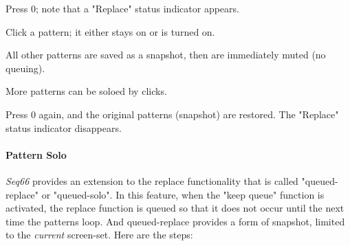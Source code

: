    \begin{enumber}
      \item Press 0; note that a "Replace" status indicator appears.
      \item Click a pattern; it either stays on or is turned on.
      \item All other patterns are saved as a snapshot, then are immediately
          muted (no queuing).
      \item More patterns can be soloed by clicks.
      \item Press 0 again, and the original patterns (snapshot) are restored.
          The "Replace" status indicator disappears.
   \end{enumber}

\paragraph{Pattern Solo}
\label{paragraph:patterns_pattern_solo}

   \textsl{Seq66} provides an extension to the replace functionality
   that is called "queued-replace" or "queued-solo".  In this feature, when
   the "keep queue" function is activated, the replace function is queued so
   that it does not occur until the next time the patterns loop.
   And queued-replace provides a form of snapshot, limited to the
   \textsl{current} screen-set.
   Here are the steps:

